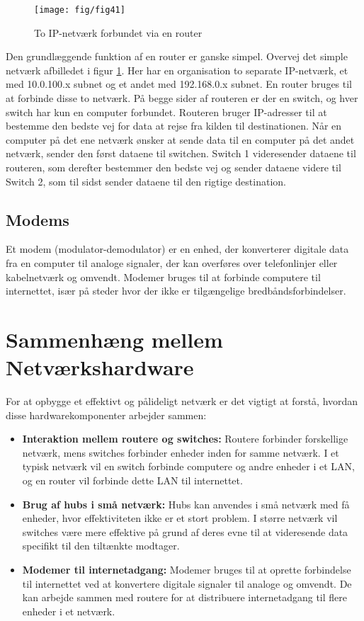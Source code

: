 \begin{figure}[h!]
	\centering
	\texttt{[image: fig/fig41]}
	\caption{To IP-netværk forbundet via en router}
	\label{fig:router}
\end{figure}
\noindent Den grundlæggende funktion af en router er ganske simpel. Overvej det simple netværk afbilledet i figur \ref{fig:router}. Her har en organisation to separate IP-netværk, et med 10.0.100.x subnet og et andet med 192.168.0.x subnet. En router bruges til at forbinde disse to netværk. På begge sider af routeren er der en switch, og hver switch har kun en computer forbundet.
\newline
\newline
\noindent Routeren bruger IP-adresser til at bestemme den bedste vej for data at rejse fra kilden til destinationen. Når en computer på det ene netværk ønsker at sende data til en computer på det andet netværk, sender den først dataene til switchen. Switch 1 videresender dataene til routeren, som derefter bestemmer den bedste vej og sender dataene videre til Switch 2, som til sidst sender dataene til den rigtige destination.

\subsection{Modems}
Et modem (modulator-demodulator) er en enhed, der konverterer digitale data fra en computer til analoge signaler, der kan overføres over telefonlinjer eller kabelnetværk og omvendt. Modemer bruges til at forbinde computere til internettet, især på steder hvor der ikke er tilgængelige bredbåndsforbindelser.

\section{Sammenhæng mellem Netværkshardware}
For at opbygge et effektivt og pålideligt netværk er det vigtigt at forstå, hvordan disse hardwarekomponenter arbejder sammen:
\begin{itemize}
	\item \textbf{Interaktion mellem routere og switches:} Routere forbinder forskellige netværk, mens switches forbinder enheder inden for samme netværk. I et typisk netværk vil en switch forbinde computere og andre enheder i et LAN, og en router vil forbinde dette LAN til internettet.
	\item \textbf{Brug af hubs i små netværk:} Hubs kan anvendes i små netværk med få enheder, hvor effektiviteten ikke er et stort problem. I større netværk vil switches være mere effektive på grund af deres evne til at videresende data specifikt til den tiltænkte modtager.
	\item \textbf{Modemer til internetadgang:} Modemer bruges til at oprette forbindelse til internettet ved at konvertere digitale signaler til analoge og omvendt. De kan arbejde sammen med routere for at distribuere internetadgang til flere enheder i et netværk.
\end{itemize}

